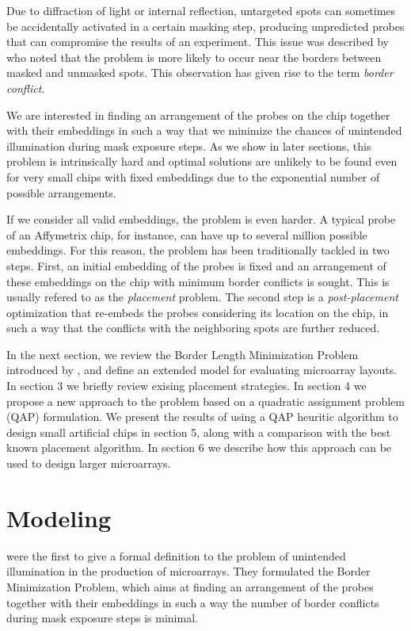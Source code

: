 \documentclass{bioinfo}
\begin{document}
Due to diffraction of light or internal reflection, untargeted spots can sometimes be accidentally activated in a certain masking step, producing unpredicted probes that can compromise the results of an experiment. This issue was described by \citealp{FODOR91} who noted that the problem is more likely to occur near the borders between masked and unmasked spots. This observation has given rise to the term \emph{border conflict}.

We are interested in finding an arrangement of the probes on the chip together with their embeddings in such a way that we minimize the chances of unintended illumination during mask exposure steps. As we show in later sections, this problem is intrinsically hard and optimal solutions are unlikely to be found even for very small chips with fixed embeddings due to the exponential number of possible arrangements.

If we consider all valid embeddings, the problem is even harder. A typical probe of an Affymetrix chip, for instance, can have up to several million possible embeddings. For this reason, the problem has been traditionally tackled in two steps. First, an initial embedding of the probes is fixed and an arrangement of these embeddings on the chip with minimum border conflicts is sought. This is usually refered to as the \emph{placement} problem. The second step is a \emph{post-placement} optimization that re-embeds the probes considering its location on the chip, in such a way that the conflicts with the neighboring spots are further reduced.

In the next section, we review the Border Length Minimization Problem introduced by \citealp{HANNENHALLI02}, and define an extended model for evaluating microarray layouts. In section 3 we briefly review exising placement strategies. In section 4 we propose a new approach to the problem based on a quadratic assignment problem (QAP) formulation. We present the results of using a QAP heuritic algorithm to design small artificial chips in section 5, along with a comparison with the best known placement algorithm. In section 6 we describe how this approach can be used to design larger microarrays.

\section{Modeling}

\citealp{HANNENHALLI02} were the first to give a formal definition to the problem of unintended illumination in the production of microarrays. They formulated the Border Minimization Problem, which aims at finding an arrangement of the probes together with their embeddings in such a way the number of border conflicts during mask exposure steps is minimal.
\end{document}
